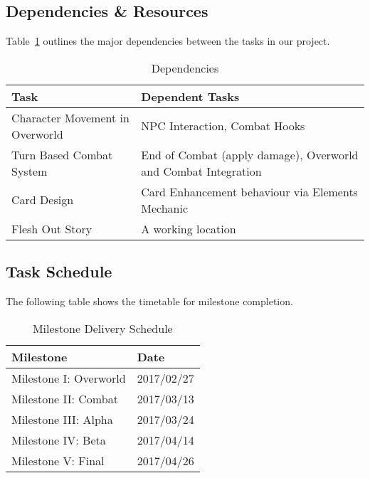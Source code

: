 \documentclass[12pt,titlepage]{article}
\begin{document}
\subsection{Dependencies \& Resources}
Table~\ref{tab:dependencies} outlines the major dependencies between the tasks
in our project.
\begin{table}[H]
    \caption{Dependencies}
    \label{tab:dependencies}
    \centering
    \begin{tabularx}{\linewidth}{|l|X|}
        \hline
        \textbf{Task} & \textbf{Dependent Tasks} \\
        \hline
        Character Movement in Overworld & NPC Interaction, Combat Hooks \\
        \hline
        Turn Based Combat System & End of Combat (apply damage), Overworld and
        Combat Integration \\
        \hline
        Card Design & Card Enhancement behaviour via Elements Mechanic \\
        \hline
        Flesh Out Story & A working location \\
        \hline
    \end{tabularx}
\end{table}

\subsection{Task Schedule}
The following table shows the timetable for milestone completion.
\begin{table}[H]
    \caption{Milestone Delivery Schedule}
    \label{tab:schedule}
    \centering
    \begin{tabular}{|l|l|}
        \hline
        \textbf{Milestone} & \textbf{Date} \\
        \hline
        Milestone I: Overworld & 2017/02/27 \\
        \hline
        Milestone II: Combat & 2017/03/13 \\
        \hline
        Milestone III: Alpha & 2017/03/24 \\
        \hline
        Milestone IV: Beta & 2017/04/14 \\
        \hline
        Milestone V: Final & 2017/04/26 \\
        \hline
    \end{tabular}
\end{table}
\end{document}
